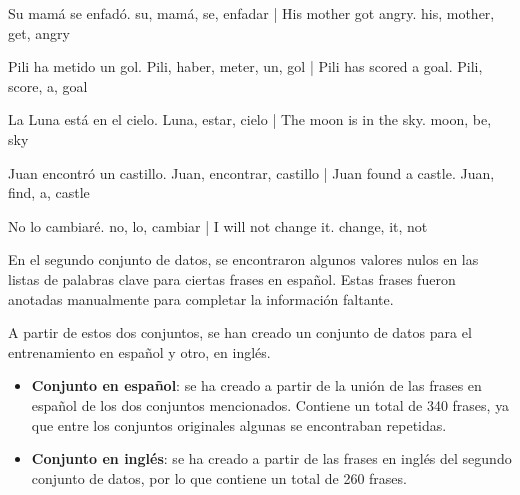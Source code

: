 \documentclass[11pt,spanish,listoffigures,listoftables]{tfgetsinf}
\begin{document}

\begin{displayquote}

Su mamá se enfadó.	su, mamá, se, enfadar | His mother got angry.	his, mother, get, angry

Pili ha metido un gol.	Pili, haber, meter, un, gol | Pili has scored a goal.	Pili, score, a, goal 

La Luna está en el cielo.	Luna, estar, cielo | The moon is in the sky.	moon, be, sky 

Juan encontró un castillo.	Juan, encontrar, castillo | Juan found a castle.	Juan, find, a, castle 

No lo cambiaré.	no, lo, cambiar | I will not change it.	change, it, not  

\end{displayquote}

En el segundo conjunto de datos, se encontraron algunos valores nulos en las listas de palabras clave para ciertas frases en español. Estas frases fueron anotadas manualmente para completar la información faltante.

A partir de estos dos conjuntos, se han creado un conjunto de datos para el entrenamiento en español y otro, en inglés.

\begin{itemize}
	\item \textbf{Conjunto en español}: se ha creado a partir de la unión de las frases en español de los dos conjuntos mencionados. Contiene un total de 340 frases, ya que entre los conjuntos originales algunas se encontraban repetidas.
	\item \textbf {Conjunto en inglés}: se ha creado a partir de las frases en inglés del segundo conjunto de datos, por lo que contiene un total de 260 frases.
\end{itemize}
\end{document}
